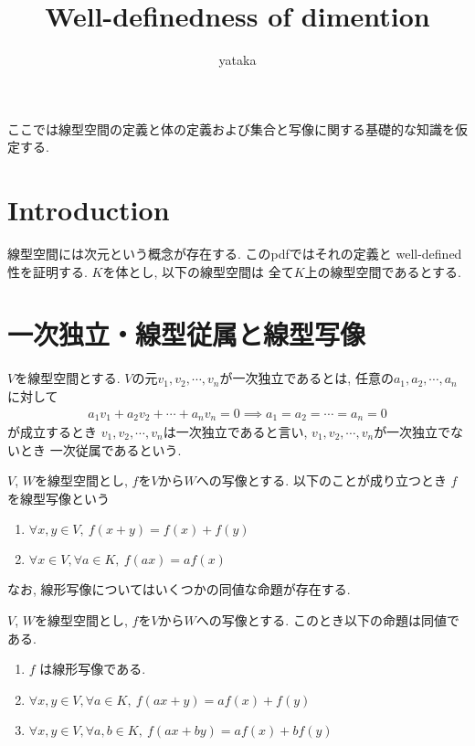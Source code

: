 \documentclass[11pt, a4paper, dvipdfmx]{jsarticle}
\title{Well-definedness of dimention}
\author{yataka}
\date{}
\theoremstyle{definition}
\newtheorem[S]{Def+}[Axiom+]{Definition}
\newtheorem[S]{Thm+}[Axiom+]{Theorem}
\newtheorem[S]{Prop+}[Axiom+]{Proposition}
\newtheorem[S]{Lemma+}[Axiom+]{Lemma}
\begin{document}
\maketitle
ここでは線型空間の定義と体の定義および集合と写像に関する基礎的な知識を仮定する.
\tableofcontents
\section{Introduction}
線型空間には次元という概念が存在する. このpdfではそれの定義と well-defined 性を証明する. $K$を体とし, 以下の線型空間は
全て$K$上の線型空間であるとする.
\section{一次独立・線型従属と線型写像}
\begin{Def+}
    $V$を線型空間とする. $V$の元$v_{1}, v_{2}, \cdots, v_{n}$が一次独立であるとは, 任意の$a_{1}, a_{2}, \cdots, a_{n}$に対して
    \begin{align*}
        a_{1}v_{1} + a_{2}v_{2} + \cdots + a_{n}v_{n} = 0\implies a_{1} = a_{2} = \cdots = a_{n} = 0
    \end{align*}
    が成立するとき $v_{1}, v_{2}, \cdots, v_{n}$は一次独立であると言い, $v_{1}, v_{2}, \cdots, v_{n}$が一次独立でないとき
    一次従属であるという.
\end{Def+}
\begin{Def+}[線型写像]
    $V$, $W$を線型空間とし, $f$を$V$から$W$への写像とする. 以下のことが成り立つとき
    $f$を線型写像という
    \begin{enumerate}
        \item $\forall x, y\in V,~f(x + y) = f(x) + f(y)$
        \item $\forall x\in V, \forall a\in K,~f(ax) = af(x)$
    \end{enumerate}
\end{Def+}
なお, 線形写像についてはいくつかの同値な命題が存在する.
\begin{Prop+}
    $V$, $W$を線型空間とし, $f$を$V$から$W$への写像とする. このとき以下の命題は同値である.
    \begin{enumerate}
        \item $f$ は線形写像である.
        \item $\forall x, y\in V, \forall a\in K,~ f(ax + y) = af(x) + f(y)$
        \item $\forall x, y\in V, \forall a, b\in K,~ f(ax + by) = af(x) + bf(y)$
    \end{enumerate}
\end{Prop+}
\end{document}
